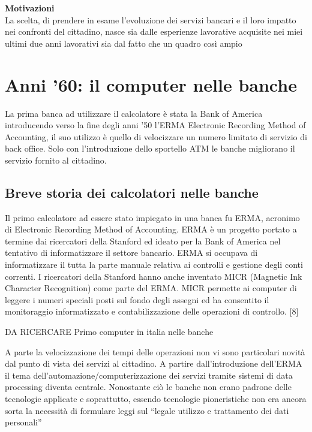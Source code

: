 \documentclass[aip, reprint]{article}
\begin{document}
\textbf{Motivazioni}\\
La scelta, di prendere in esame l'evoluzione dei servizi bancari e il loro impatto nei confronti del cittadino, nasce sia dalle esperienze lavorative acquisite nei miei ultimi due anni lavorativi sia dal fatto che un quadro così ampio 

\newpage


\section{Anni ’60: il computer nelle banche}
La prima banca ad utilizzare il calcolatore è stata la Bank of America introducendo verso la fine degli anni ’50 l’ERMA Electronic Recording Method of Accounting, il suo utilizzo è quello di velocizzare un numero limitato di servizio di back office. Solo con l’introduzione dello sportello ATM le banche migliorano il servizio fornito al cittadino.\\
\subsection{Breve storia dei calcolatori nelle banche}
Il primo calcolatore ad essere stato impiegato in una banca fu ERMA, acronimo di Electronic Recording Method of Accounting.
ERMA è un progetto portato a termine dai ricercatori della Stanford ed ideato per la Bank of America nel tentativo di informatizzare il settore bancario. ERMA si occupava di informatizzare il tutta la parte manuale relativa ai controlli e gestione degli conti correnti. 
I ricercatori della Stanford hanno anche inventato MICR (Magnetic Ink Character Recognition) come parte del ERMA. MICR permette ai computer di leggere i numeri speciali posti sul fondo degli assegni ed ha consentito il monitoraggio informatizzato e contabilizzazione delle operazioni di controllo. [8]

DA RICERCARE Primo computer in italia nelle banche

A parte la velocizzazione dei tempi delle operazioni non vi sono particolari novità dal punto di vista dei servizi al cittadino. 
A partire dall’introduzione dell’ERMA il tema dell’automazione/computerizzazione dei servizi tramite sistemi di data processing diventa centrale. Nonostante ciò le banche non erano padrone delle tecnologie applicate e soprattutto, essendo tecnologie pioneristiche non era ancora sorta la necessità di formulare leggi sul “legale utilizzo e trattamento dei dati personali”
\end{document}

